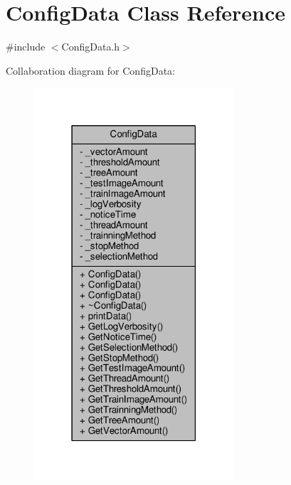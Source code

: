 \hypertarget{classConfigData}{}\section{Config\+Data Class Reference}
\label{classConfigData}


{\ttfamily \#include $<$Config\+Data.\+h$>$}



Collaboration diagram for Config\+Data\+:
\nopagebreak
\begin{figure}[H]
\begin{center}
\leavevmode
\includegraphics[width=210pt]{classConfigData__coll__graph}
\end{center}
\end{figure}
